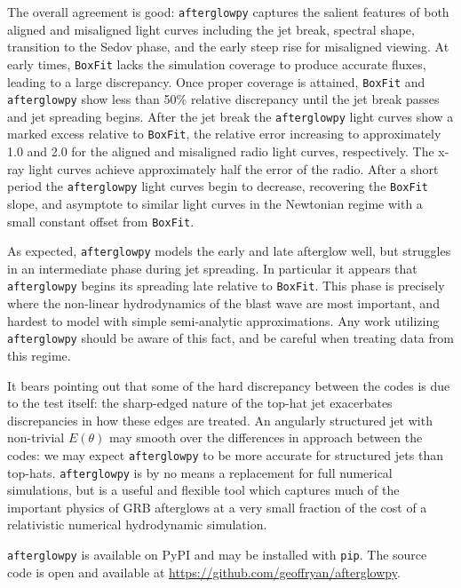 \documentclass[twocolumn]{aastex62}
\newcommand{\afterglowpy}{{\tt afterglowpy}}
\newcommand{\boxfit}{{\tt BoxFit}}
\begin{document}
The overall agreement is good: \afterglowpy{} captures the salient features of both aligned and misaligned light curves including the jet break, spectral shape, transition to the Sedov phase, and the early steep rise for misaligned viewing.  
At early times, \boxfit{} lacks the simulation coverage to produce accurate fluxes, leading to a large discrepancy.  Once proper coverage is attained, \boxfit{} and \afterglowpy{} show less than 50\% relative discrepancy until the jet break passes and jet spreading begins.  After the jet break the \afterglowpy{} light curves show a marked excess relative to \boxfit{}, the relative error increasing to approximately 1.0 and 2.0 for the aligned and misaligned radio light curves, respectively.  The x-ray light curves achieve approximately half the error of the radio.  After a short period the \afterglowpy{} light curves begin to decrease, recovering the \boxfit{} slope, and asymptote to similar light curves in the Newtonian regime with a small constant offset from \boxfit{}.

As expected, \afterglowpy{} models the early and late afterglow well, but struggles in an intermediate phase during jet spreading.  In particular it appears that \afterglowpy{} begins its spreading late relative to \boxfit{}.  This phase is precisely where the non-linear hydrodynamics of the blast wave are most important, and hardest to model with simple semi-analytic approximations.  Any work utilizing \afterglowpy{} should be aware of this fact, and be careful when treating data from this regime.

It bears pointing out that some of the hard discrepancy between the codes is due to the test itself: the sharp-edged nature of the top-hat jet exacerbates discrepancies in how these edges are treated.  An angularly structured jet with non-trivial $E(\theta)$ may smooth over the differences in approach between the codes: we may expect \afterglowpy{} to be more accurate for structured jets than top-hats.  \afterglowpy{} is by no means a replacement for full numerical simulations, but is a useful and flexible tool which captures much of the important physics of GRB afterglows at a very small fraction of the cost of a relativistic numerical hydrodynamic simulation.

\afterglowpy{} is available on PyPI and may be installed with {\tt pip}.  The source code is open and available at \url{https://github.com/geoffryan/afterglowpy}.

%
%
\end{document}
